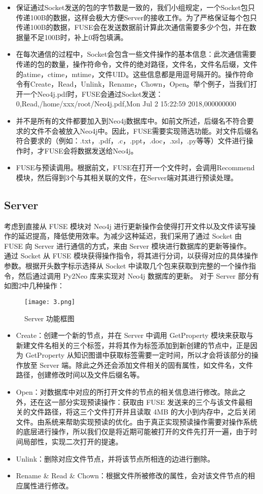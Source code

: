 \documentclass[UTF8]{ctexart}
\begin{document}
\begin{itemize}
	\item 保证通过Socket发送的包的字节数是一致的，我们小组规定，一个Socket包只传递100B的数据，这样会极大方便Server的接收工作。为了严格保证每个包只传递100B的数据，FUSE会在发送数据前计算此次通信需要多少个包，并在数据量不足100B时，补上0将包填满。
	\item 在每次通信的过程中，Socket会包含一些文件操作的基本信息：此次通信需要传递的包的数量，操作符命令，文件的绝对路径，文件名，文件名后缀，文件的atime，ctime，mtime，文件UID。这些信息都是用逗号隔开的。操作符命令有Create，Read，Unlink，Rename，Chown，Open。举个例子，当我们打开一个Neo4j.pdf时，FUSE会通过Socket发送：0,Read,/home/xxx/root/Neo4j.pdf,Mon Jul  2 15:22:59 2018,000000000
	\item 并不是所有的文件都要加入到Neo4j数据库中。如前文所述，后缀名不符合要求的文件不会被放入Neo4j中。因此，FUSE需要实现筛选功能。对文件后缀名符合要求的（例如：.txt，.pdf，.c，.ppt，.doc，.xsl，.py等等）文件进行操作时，才FUSE会将数据发送给Neo4j。
	\item FUSE与预读调用。根据前文，FUSE在打开一个文件时，会调用Recommend模块，然后得到3个与其相关联的文件，在Server端对其进行预读处理。
 \end{itemize}

\subsection{Server}
考虑到直接从 FUSE 模块对 Neo4j 进行更新操作会使得打开文件以及文件读写操作的延迟提高，降低使用效率。为减少这种延迟，我们采用了通过 Socket 由 FUSE 向 Server 进行通信的方式，来由 Server 模块进行数据库的更新等操作。
通过 Socket 从 FUSE 模块获得操作指令，将其进行分词，以获得对应的具体操作参数。根据开头数字标示选择从 Socket 中读取几个包来获取到完整的一个操作指令，然后通过调用 Py2Neo 库来实现对 Neo4j 数据库的更新。
对于 Server 部分有如图2中几种操作：

\begin{figure}
\centering\texttt{[image: 3.png]}
\caption{Server 功能框图}
\end{figure}

\begin{itemize}
	\item Create：创建一个新的节点，并在 Server 中调用 GetProperty 模块来获取与新建文件名相关的三个标签，并将其作为标签添加到新创建的节点中，正是因为 GetProperty 从知识图谱中获取标签需要一定时间，所以才会将该部分的操作放至 Server 端。除此之外还会添加文件相关的固有属性，如文件名，文件路径，创建修改时间以及文件后缀名等。
	\item Open：对数据库中对应的所打开文件的节点的相关信息进行修改。除此之外，还在这一部分实现预读操作：获取由 FUSE 发送来的三个与该文件最相关的文件路径，将这三个文件打开并且读取 4MB 的大小到内存中，之后关闭文件。由系统来帮助实现预读的优化。由于真正实现预读操作需要对操作系统的底层进行操作，所以我们仅是将近期可能被打开的文件先打开一遍，由于时间局部性，实现二次打开的提速。
	\item Unlink：删除对应文件节点，并将该节点所相连的边进行删除。
	\item Rename \& Read \& Chown：根据文件所被修改的属性，会对该文件节点的相应属性进行修改。
\end{itemize}
\end{document}

